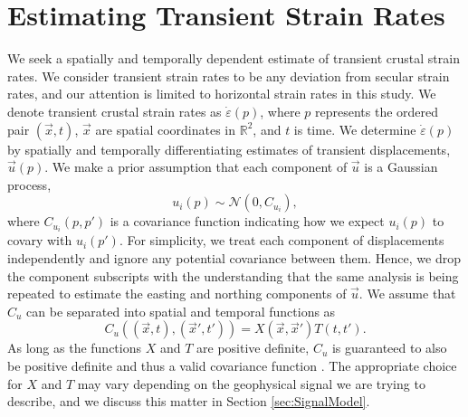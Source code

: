 \documentclass[extra,mreferee]{gji}
\begin{document}
\section{Estimating Transient Strain Rates}\label{sec:Method}
We seek a spatially and temporally dependent estimate of transient crustal strain rates. We consider transient strain rates to be any deviation from secular strain rates, and our attention is limited to horizontal strain rates in this study. We denote transient crustal strain rates as $\dot\varepsilon(p)$, where $p$ represents the ordered pair $(\vec{x},t)$, $\vec{x}$ are spatial coordinates in $\mathbb{R}^2$, and $t$ is time. We determine $\dot\varepsilon(p)$ by spatially and temporally differentiating estimates of transient displacements, $\vec{u}(p)$. We make a prior assumption that each component of $\vec{u}$ is a Gaussian process,
\begin{equation}\label{eq:TransientDeformation}
u_i(p) \sim \mathcal{N}\left(0,C_{u_i}\right),
\end{equation}
where $C_{u_i}(p,p')$ is a covariance function indicating how we expect $u_i(p)$ to covary with $u_i(p')$. For simplicity, we treat each component of displacements independently and ignore any potential covariance between them. Hence, we drop the component subscripts with the understanding that the same analysis is being repeated to estimate the easting and northing components of $\vec{u}$. We assume that $C_u$ can be separated into spatial and temporal functions as 
\begin{equation}\label{eq:TransientCovariance}
C_{u}\left((\vec{x},t),(\vec{x}',t')\right) = X(\vec{x},\vec{x}')T(t,t').
\end{equation}  
As long as the functions $X$ and $T$ are positive definite, $C_u$ is guaranteed to also be positive definite and thus a valid covariance function \citep[sec. 4.2.4]{Rasmussen2006}. The appropriate choice for $X$ and $T$ may vary depending on the geophysical signal we are trying to describe, and we discuss this matter in Section \ref{sec:SignalModel}.  
\end{document}
